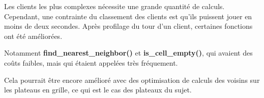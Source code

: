 Les clients les plus complexes nécessite une grande quantité de calculs.
Cependant, une contrainte du classement des clients est qu'ils puissent jouer en moins de deux secondes.
Après profilage du tour d'un client, certaines fonctions ont été améliorées.

Notamment \textbf{find\_nearest\_neighbor()} et \textbf{is\_cell\_empty()}, qui avaient des coûts faibles, 
mais qui étaient appelées très fréquement.

Cela pourrait être encore amélioré avec des 
optimisation de calculs des voisins sur les plateaus en grille, 
ce qui est le cas des plateaux du sujet. 